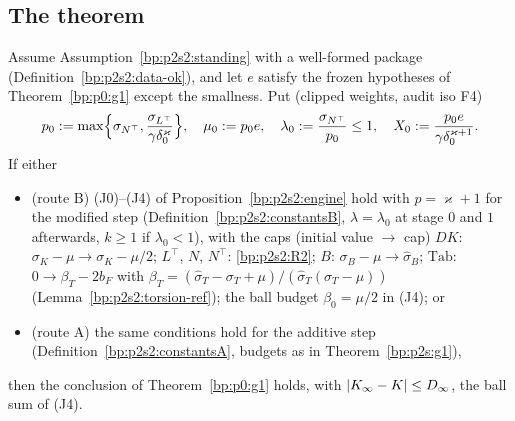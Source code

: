 \subsection{The theorem}\label{bp:p2s2:sec-g1}

\begin{theorem}\label{bp:p2s2:g1}
Assume Assumption~\ref{bp:p2s2:standing} with a well-formed package (Definition~\ref{bp:p2s2:data-ok}), and let $e$ satisfy the frozen hypotheses of
Theorem~\ref{bp:p0:g1} except the smallness. Put (clipped weights, audit iso F4)
\[
p_0:=\max\Bigl\{\sigma_{N^\top},\frac{\sigma_{L^\top}}{\gamma\delta_0^\varkappa}\Bigr\},\quad\mu_0:=p_0e,\quad\lambda_0:=\frac{\sigma_{N^\top}}{p_0}\le1,\quad
X_0:=\frac{p_0e}{\gamma\delta_0^{\varkappa+1}}.
\]
If either
\begin{itemize}
\item (route B) (J0)--(J4) of Proposition~\ref{bp:p2s2:engine} hold with $p=\varkappa+1$ for the modified step (Definition~\ref{bp:p2s2:constantsB}, $\lambda=\lambda_0$ at stage
  $0$ and $1$ afterwards, $k\ge1$ if $\lambda_0<1$), with the caps (initial value $\to$ cap) $DK$: $\sigma_K-\mu\to\sigma_K-\mu/2$; $L^\top$, $N$, $N^\top$: \ref{bp:p2s2:R2};
  $B$: $\sigma_B-\mu\to\hat\sigma_B$; $\mathrm{Tab}$: $0\to\beta_T-2b_F$ with $\beta_T=(\hat\sigma_T-\sigma_T+\mu)/(\hat\sigma_T(\sigma_T-\mu))$ (Lemma~\ref{bp:p2s2:torsion-ref});
  the ball budget $\beta_0=\mu/2$ in (J4); or
\item (route A) the same conditions hold for the additive step (Definition~\ref{bp:p2s2:constantsA}, budgets as in Theorem~\ref{bp:p2s:g1}),
\end{itemize}
then the conclusion of Theorem~\ref{bp:p0:g1} holds, with $\lvert K_\infty-K\rvert\le D_\infty$, the ball sum of (J4).
\end{theorem}

